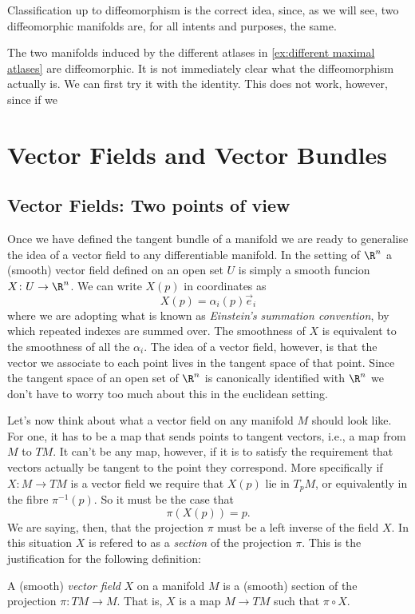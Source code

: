 \documentclass[12pt,oneside]{book}
\begin{document}
Classification up to diffeomorphism is the correct idea, since, as we will see, two diffeomorphic manifolds are, for all intents and purposes, the same.

\begin{example}
	The two manifolds induced by the different atlases in \cref{ex:different maximal atlases} are diffeomorphic. It is not immediately clear what the diffeomorphism actually is. We can first try it with the identity. This does not work, however, since if we    
\end{example}


\chapter{Vector Fields and Vector Bundles}

\section{Vector Fields: Two points of view}
Once we have defined the tangent bundle of a manifold we are ready to generalise the idea
of a vector field to any differentiable manifold. In the setting of \( \R^n \) a (smooth)
vector field defined on an open set \( U \) is simply a smooth funcion \( X \colon U \to
\R^n \). We can write \( X(p) \) in coordinates as
\begin{equation} \label{eq:coordinates of vector field}
	X(p) = \alpha_i(p) \vec{e}_i
\end{equation}
where we are adopting what is known as \emph{Einstein's summation convention}, by which
repeated indexes are summed over. The smoothness of \( X \) is equivalent to the
smoothness of all the \( \alpha_i \). The idea of a vector field, however, is that the
vector we associate to each point lives in the tangent space of that point. Since the
tangent space of an open set of \( \R^n \) is canonically identified with \( \R^n \) we
don't have to worry too much about this in the euclidean setting.

Let's now think about what a vector field on any manifold \( M \) should look like. For
one, it has to be a map that sends points to tangent vectors, i.e., a map from \( M \) to
\( TM \). It can't be any map, however, if it is to satisfy the requirement that vectors
actually be tangent to the point they correspond. More specifically if \( X \colon M \to
TM \) is a vector field we require that \( X(p) \) lie in \( T_p M \), or equivalently in
the fibre \( \pi^{-1}(p) \). So it must be the case that
\begin{equation*}
	\pi(X(p)) = p.
\end{equation*}
We are saying, then, that the projection \( \pi \) must be a left inverse of the field \(
X\). In this situation \( X \) is refered to as a \emph{section} of the projection \( \pi
\). This is the justification for the following definition:
\begin{definition}
	A (smooth) \emph{vector field} \( X \) on a manifold \( M \) is a (smooth) section of
	the projection \( \pi \colon TM \to M \). That is, \( X \) is a map \( M \to TM \) such
	that \( \pi \circ X \).
\end{definition}
\end{document}
